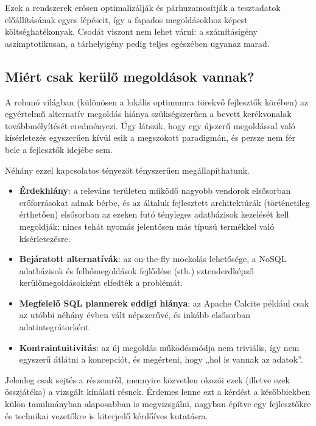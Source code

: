 \documentclass[
    parspace,
    noindent,
    nohyp,
]{elteiktdk}[2023/04/10]
\begin{document}
Ezek a rendszerek erősen optimalizálják és párhuzamosítják a tesztadatok előállításának egyes lépéseit,
így a fapados megoldásokhoz képest költséghatékonyak.
Csodát viszont nem lehet várni: a számításigény aszimptotikusan,
a tárhelyigény pedig teljes egészében ugyanaz marad.

\subsection{Miért csak kerülő megoldások vannak?}

A rohanó világban (különösen a lokális optimumra törekvő fejlesztők körében)
az egyértelmű alternatív megoldás hiánya szükségszerűen
a bevett kerékvonalak továbbmélyítését eredményezi.
Úgy látszik, hogy egy újszerű megoldással való kísérletezés egyszerűen
kívül esik a megszokott paradigmán, és persze nem fér bele a fejlesztők idejébe sem.

Néhány ezzel kapcsolatos tényezőt tényszerűen megállapíthatunk.

\begin{itemize}
    \item \textbf{Érdekhiány}: a releváns területen működő nagyobb vendorok elsősorban
          erőforrásokat adnak bérbe, és az általuk fejlesztett architektúrák (történetileg érthetően)
          elsősorban az ezeken futó tényleges adatbázisok kezelését kell megoldják;
          nincs tehát nyomás jelentősen más típusú termékkel való kísérletezésre.
    \item \textbf{Bejáratott alternatívák}: az on-the-fly mockolás lehetősége,
          a NoSQL adatbázisok és felhőmegoldások fejlődése (stb.)
          sztenderdképző kerülőmegoldásokként elfedték a problémát.
    \item \textbf{Megfelelő SQL plannerek eddigi hiánya}: az Apache Calcite például
          csak az utóbbi néhány évben vált népszerűvé, és inkább elsősorban adatintegrátorként.
    \item \textbf{Kontraintuitivitás}: az új megoldás működésmódja nem triviális,
          így nem egyszerű átlátni a koncepciót, és megérteni, hogy „hol is vannak az adatok”.
\end{itemize}

Jelenleg csak sejtés a részemről, mennyire közvetlen okozói ezek (illetve ezek összjátéka) a vizsgált kínálati résnek.
Érdemes lenne ezt a kérdést a későbbiekben külön tanulmányban alaposabban is megvizsgálni,
nagyban építve egy fejlesztőkre és technikai vezetőkre is kiterjedő kérdőíves kutatásra.
\end{document}
